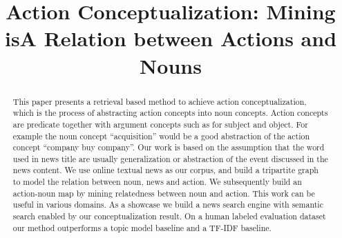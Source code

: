 \documentclass[conference]{IEEEtran}
\begin{document}
%
\title{Action Conceptualization: Mining isA Relation between Actions and Nouns}

\author{

}


\maketitle

\begin{abstract}
This paper presents a retrieval based method to achieve action conceptualization,
 which is the process of abstracting action concepts into noun concepts. Action
 concepts are predicate together with argument concepts such as for subject and
 object. For example the noun concept ``acquisition'' would be a good abstraction
 of the action concept ``company buy company''.
 Our work is based on the assumption that the word used in news title are
 usually generalization or abstraction of the event discussed in the news content.
 We use online textual news as our corpus, and build a tripartite graph to model
 the relation between noun, news and action. We subsequently build an action-noun map
 by mining relatedness between noun and action. This work can be useful in various
 domains. As a showcase we build a news search engine with semantic search enabled
 by our conceptualization result. On a human labeled evaluation dataset our method
 outperforms a topic model baseline and a TF-IDF baseline.
\end{abstract}




%
\IEEEpeerreviewmaketitle
\end{document}
